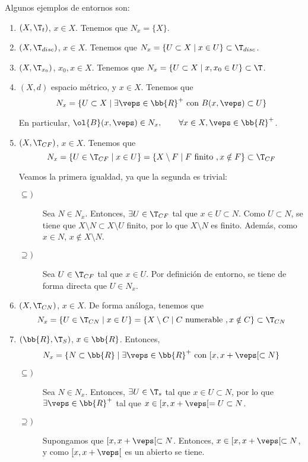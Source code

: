 \begin{ejemplo} Algunos ejemplos de entornos son:
    \begin{enumerate}
        \item $(X,\T_t)$, $x\in X$. Tenemos que $N_x=\{X\}$.
        \item $(X,\T_{disc})$, $x\in X$. Tenemos que $N_x=\{U\subset X\mid x\in U\}\subset \T_{disc}$.
        \item $(X,\T_{x_0})$, $x_0, x\in X$. Tenemos que $N_x=\{U\subset X\mid x,x_0\in U\}\subset \T$.
        \item $(X,d)$ espacio métrico, y $x\in X$. Tenemos que $$N_x=\{U\subset X\mid \exists \veps\in \bb{R}^+ \text{ con } B(x,\veps)\subset U\}$$

        En particular, $\ol{B}(x,\veps)\in N_x, \qquad \forall x\in X, \veps\in \bb{R}^+$.

        \item $(X,\T_{CF})$, $x\in X$. Tenemos que $$N_x= \{U\in \T_{CF}\mid x\in U\}=\{X\setminus F\mid F\text{ finito }, x\notin F\} \subset \T_{CF}$$

        Veamos la primera igualdad, ya que la segunda es trivial:
        \begin{description}
            \item [$\subseteq)$] Sea $N\in N_x$. Entonces, $\exists U\in \T_{CF}$ tal que $x\in U\subset N$. Como $U\subset N$, se tiene que $X\setminus N \subset X\setminus U$ finito, por lo que $X\setminus N$ es finito. Además, como $x\in N$, $x\notin X\setminus N$.

            \item [$\supseteq)$] Sea $U\in \T_{CF}$ tal que $x\in U$. Por definición de entorno, se tiene de forma directa que $U\in N_x$.
        \end{description}

        \item $(X,\T_{CN})$, $x\in X$. De forma análoga, tenemos que $$N_x= \{U\in \T_{CN}\mid x\in U\}=\{X\setminus C\mid C\text{ numerable }, x\notin C\} \subset \T_{CN}$$

        \item $(\bb{R}, \T_S)$, $x\in \bb{R}$. Entonces, 
        $$N_x=\{N\subset \bb{R}\mid \exists \veps\in \bb{R}^+ \text{ con } [x,x+\veps[\subset N\}$$
        \begin{description}
            \item [$\subseteq)$] Sea $N\in N_x$. Entonces, $\exists U\in \T_s$ tal que $x\in U\subset N$, por lo que $\exists \veps\in \bb{R}^+$ tal que $x\in [x,x+\veps[= U\subset N$.

            \item [$\supseteq)$] Supongamos que $[x,x+\veps[\subset N$. Entonces, $x\in [x,x+\veps[\subset N$, y como $[x,x+\veps[$ es un abierto se tiene.
        \end{description}
    \end{enumerate}
\end{ejemplo}

